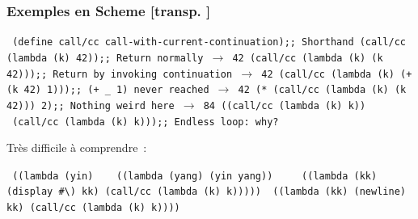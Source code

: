 \documentclass[mathserif,a4paper,aspectratio=169]{beamer}
\renewcommand{\frametitle}[1]{\subsubsection*{#1 {\footnotesize[transp. \insertframenumber]}}}
\begin{document}
\begin{frame}
\frametitle{Exemples en Scheme}

{\tt
(define call/cc call-with-current-continuation)\hfill ;; Shorthand\newline
(call/cc (lambda (k) 42))\hfill ;; Return normally\newline
$\rightarrow$ 42\newline
(call/cc (lambda (k) (k 42)))\hfill ;; Return by invoking continuation\newline
$\rightarrow$ 42\newline
(call/cc (lambda (k) (+ (k 42) 1)))\hfill ;; (+ \_ 1) never reached\newline
$\rightarrow$ 42\newline
(* (call/cc (lambda (k) (k 42))) 2)\hfill ;; Nothing weird here\newline
$\rightarrow$ 84\newline
((call/cc (lambda (k) k))\newline
\ (call/cc (lambda (k) k)))\hfill ;; Endless loop: why?
\par}

\bigskip

{\footnotesize

Très difficile à comprendre :

{\tt
((lambda (yin)\newline
\ \ \ ((lambda (yang) (yin yang))\newline
\ \ \ \ ((lambda (kk) (display \#\textbackslash *) kk) (call/cc (lambda (k) k)))))\newline
\ ((lambda (kk) (newline) kk) (call/cc (lambda (k) k))))
\par}

}

\end{frame}
%
\end{document}
